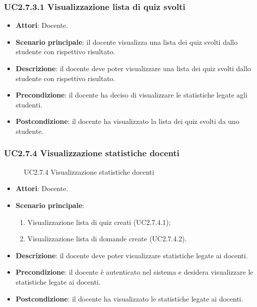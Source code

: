 \subsubsection{UC2.7.3.1 Visualizzazione lista di quiz svolti}
\begin{itemize}
\item \textbf{Attori}: Docente.
\item \textbf{Scenario principale}: il docente visualizza una lista dei quiz svolti dallo studente con rispettivo risultato.
\item \textbf{Descrizione}: il docente deve poter visualizzare una lista dei quiz svolti dallo studente con rispettivo risultato.
\item \textbf{Precondizione}: il docente ha deciso di visualizzare le statistiche legate agli studenti.
\item \textbf{Postcondizione}: il docente ha visualizzato la lista dei quiz svolti da uno studente.
\end{itemize}
\subsubsection{UC2.7.4 Visualizzazione statistiche docenti}
\begin{figure}[H]
\centering
\noindent{}
\caption{UC2.7.4 Visualizzazione statistiche docenti}
\end{figure}
\begin{itemize}
\item \textbf{Attori}: Docente.
\item \textbf{Scenario principale}:
\begin{enumerate}
\item Visualizzazione lista di quiz creati (UC2.7.4.1);
\item Visualizzazione lista di domande create (UC2.7.4.2).
\end{enumerate}
\item \textbf{Descrizione}: il docente deve poter visualizzare statistiche legate ai docenti.
\item \textbf{Precondizione}: il docente è autenticato nel sistema e desidera visualizzare le statistiche legate ai docenti.
\item \textbf{Postcondizione}: il docente ha visualizzato le statistiche legate ai docenti.
\end{itemize}
